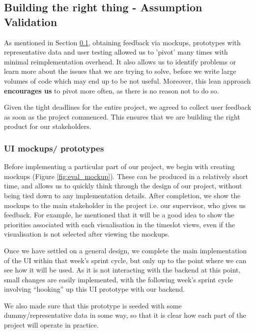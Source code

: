 \documentclass[a4paper, titlepage]{article}
\begin{document}
\subsection{Building the right thing - Assumption Validation} \label{sec:eval_validation}

As mentioned in Section \ref{sec:eval_validation}, obtaining feedback via mockups, prototypes with representative data and user testing allowed us to 'pivot' many times with minimal reimplementation overhead. It also allows us to identify problems or learn more about the issues that we are trying to solve, before we write large volumes of code which may end up to be not useful. Moreover, this lean approach \textbf{encourages us} to pivot more often, as there is no reason not to do so.

Given the tight deadlines for the entire project, we agreed to collect
user feedback as soon as the project commenced. This ensures that we are building the right product for our stakeholders.

\subsubsection{UI mockups/ prototypes} \label{sec:eval_uimockup}

Before implementing a particular part of our project, we begin with creating mockups (Figure \ref{fig:eval_mockup}). These can be produced in a relatively short time, and allows us to quickly think through the design of our project, without being tied down to any implementation details. After completion, we show the mockups to the main stakeholder in the project i.e. our supervisor, who gives us feedback. For example, he mentioned that it will be a good idea to show the priorities associated with each visualisation in the timeslot views, even if the visualisation is not selected after viewing the mockups.

Once we have settled on a general design, we complete the main implementation of the UI within that week's sprint cycle, but only up to the point where we can see how it will be used. As it is not interacting with the backend at this point, small changes are easily implemented, with the following week's sprint cycle involving ``hooking'' up this UI prototype with our backend.

We also made sure that this prototype is seeded with some dummy/representative data in some way, so that it is clear how each part of the project will operate in practice.
\end{document}

